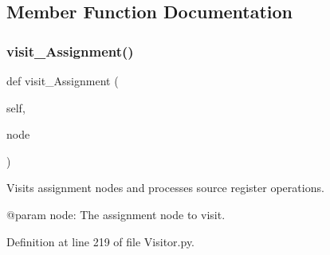 \subsection{Member Function Documentation}
\mbox{\label{classPostProcessor_1_1Visitor_1_1SourceRegHandler_adae6ad6f5b94c4acd95924bb3df9ebc8}} 
\subsubsection{\texorpdfstring{visit\+\_\+\+Assignment()}{visit\_Assignment()}}
{\footnotesize\ttfamily def visit\+\_\+\+Assignment (\begin{DoxyParamCaption}\item[{}]{self,  }\item[{}]{node }\end{DoxyParamCaption})}

\begin{DoxyVerb}Visits assignment nodes and processes source register operations.

@param node: The assignment node to visit.
\end{DoxyVerb}
 

Definition at line 219 of file Visitor.\+py.


